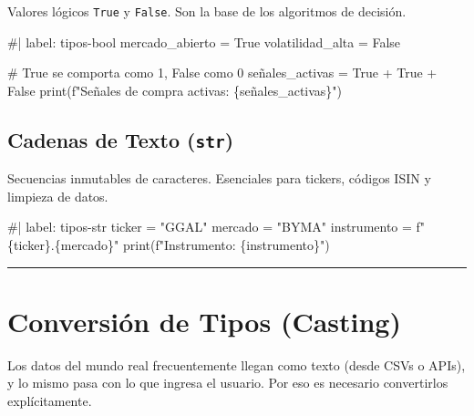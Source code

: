 \documentclass[
  spanish,
  letterpaper,
  DIV=11,
  numbers=noendperiod]{scrreprt}
\newenvironment{Shaded}{\begin{snugshade}}{\end{snugshade}}
\newcommand{\NormalTok}[1]{\textcolor[rgb]{0.00,0.23,0.31}{#1}}
\begin{document}
Valores lógicos \texttt{True} y \texttt{False}. Son la base de los
algoritmos de decisión.

\begin{Shaded}
\begin{Highlighting}[]
\NormalTok{\#| label: tipos{-}bool}
\NormalTok{mercado\_abierto = True}
\NormalTok{volatilidad\_alta = False}

\NormalTok{\# True se comporta como 1, False como 0}
\NormalTok{señales\_activas = True + True + False}
\NormalTok{print(f"Señales de compra activas: \{señales\_activas\}")}
\end{Highlighting}
\end{Shaded}

\subsection{\texorpdfstring{Cadenas de Texto
(\texttt{str})}{Cadenas de Texto (str)}}\label{cadenas-de-texto-str}

Secuencias inmutables de caracteres. Esenciales para tickers, códigos
ISIN y limpieza de datos.

\begin{Shaded}
\begin{Highlighting}[]
\NormalTok{\#| label: tipos{-}str}
\NormalTok{ticker = "GGAL"}
\NormalTok{mercado = "BYMA"}
\NormalTok{instrumento = f"\{ticker\}.\{mercado\}"}
\NormalTok{print(f"Instrumento: \{instrumento\}")}
\end{Highlighting}
\end{Shaded}

\begin{center}\rule{0.5\linewidth}{0.5pt}\end{center}

\section{Conversión de Tipos
(Casting)}\label{conversiuxf3n-de-tipos-casting}

Los datos del mundo real frecuentemente llegan como texto (desde CSVs o
APIs), y lo mismo pasa con lo que ingresa el usuario. Por eso es
necesario convertirlos explícitamente.

\begin{Shaded}
\end{Shaded}
\end{document}
